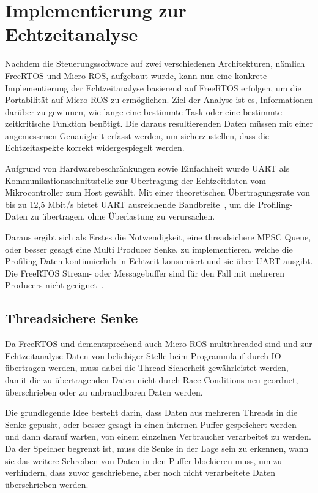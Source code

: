 \section{Implementierung zur Echtzeitanalyse}

Nachdem die Steuerungssoftware auf zwei verschiedenen Architekturen, nämlich
FreeRTOS und Micro-ROS, aufgebaut wurde, kann nun eine konkrete Implementierung
der Echtzeitanalyse basierend auf FreeRTOS erfolgen, um die Portabilität auf
Micro-ROS zu ermöglichen. Ziel der Analyse ist es, Informationen darüber zu
gewinnen, wie lange eine bestimmte Task oder eine bestimmte zeitkritische
Funktion benötigt. Die daraus resultierenden Daten müssen mit einer angemessenen
Genauigkeit erfasst werden, um sicherzustellen, dass die Echtzeitaspekte korrekt
widergespiegelt werden.

Aufgrund von Hardwarebeschränkungen sowie Einfachheit wurde UART als
Kommunikationsschnittstelle zur Übertragung der Echtzeitdaten vom
Mikrocontroller zum Host gewählt. Mit einer theoretischen Übertragungsrate von
bis zu 12,5 Mbit/s bietet UART ausreichende Bandbreite~\cite[S.
2]{stm32_datasheet}, um die Profiling-Daten zu übertragen, ohne Überlastung zu
verursachen.

Daraus ergibt sich als Erstes die Notwendigkeit, eine threadsichere \ac{MPSC}
Queue, oder besser gesagt eine Multi Producer Senke, zu implementieren, welche
die Profiling-Daten kontinuierlich in Echtzeit konsumiert und sie über UART
ausgibt. Die FreeRTOS Stream- oder Messagebuffer sind für den Fall mit mehreren
Producers nicht geeignet~\cite{FreeRTOSStreamBuffer}.

\subsection{Threadsichere Senke}

Da FreeRTOS und dementsprechend auch Micro-ROS multithreaded sind und zur
Echtzeitanalyse Daten von beliebiger Stelle beim Programmlauf durch IO
übertragen werden, muss dabei die Thread-Sicherheit gewährleistet werden, damit
die zu übertragenden Daten nicht durch Race Conditions neu geordnet,
überschrieben oder zu unbrauchbaren Daten werden.

Die grundlegende Idee besteht darin, dass Daten aus mehreren Threads in die
Senke gepusht, oder besser gesagt in einen internen Puffer gespeichert werden
und dann darauf warten, von einem einzelnen Verbraucher verarbeitet zu werden.
Da der Speicher begrenzt ist, muss die Senke in der Lage sein zu erkennen, wann
sie das weitere Schreiben von Daten in den Puffer blockieren muss, um zu
verhindern, dass zuvor geschriebene, aber noch nicht verarbeitete Daten
überschrieben werden.

